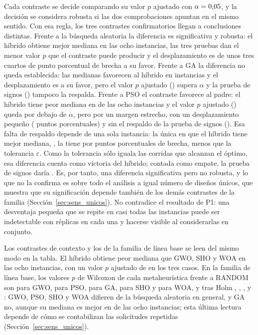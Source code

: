 Cada contraste se decide comparando su valor $p$ ajustado con $\alpha=\text{0,05}$, y la decisión se considera robusta si las dos comprobaciones apuntan en el mismo sentido. Con esa regla, los tres contrastes confirmatorios llegan a conclusiones distintas. Frente a la búsqueda aleatoria la diferencia es significativa y robusta: el híbrido obtiene mejor mediana en las ocho instancias, las tres pruebas dan el menor valor $p$ que el contraste puede producir y el desplazamiento es de unos tres cuartos de punto porcentual de brecha a su favor. Frente a GA la diferencia no queda establecida: las medianas favorecen al híbrido en \CtrlGaMedianWins{} instancias y el desplazamiento es a su favor, pero el valor $p$ ajustado (\CtrlGaWilcoxonHolm) supera $\alpha$ y la prueba de signos (\CtrlGaSignP) tampoco la respalda. Frente a PSO el contraste favorece al padre: el híbrido tiene peor mediana en \CtrlPsoMedianLosses{} de las ocho instancias y el valor $p$ ajustado (\CtrlPsoWilcoxonHolm) queda por debajo de $\alpha$, pero por un margen estrecho, con un desplazamiento pequeño (\CtrlPsoShift{} puntos porcentuales) y sin el respaldo de la prueba de signos (\CtrlPsoSignP). Esa falta de respaldo depende de una sola instancia: la única en que el híbrido tiene mejor mediana, \CtrlPsoSubTolInstances, la tiene por \CtrlPsoSubTolDiff{} puntos porcentuales de brecha, menos que la tolerancia $\varepsilon$. Como la tolerancia sólo iguala las corridas que alcanzan el óptimo, esa diferencia cuenta como victoria del híbrido; contada como empate, la prueba de signos daría \CtrlPsoSignTiesP. Es, por tanto, una diferencia significativa pero no robusta, y lo que no la confirma es sobre todo el análisis a igual número de diseños únicos, que muestra que su significación depende también de los demás contrastes de la familia (Sección~\ref{sec:sens_unicos}). No contradice el resultado de P1: una desventaja pequeña que se repite en casi todas las instancias puede ser indetectable con \Replicates{} réplicas en cada una y hacerse visible al considerarlas en conjunto.

Los contrastes de contexto y los de la familia de línea base se leen del mismo modo en la tabla. El híbrido obtiene peor mediana que GWO, SHO y WOA en las ocho instancias, con un valor $p$ ajustado de \CtrlGwoWilcoxonHolm{} en los tres casos. En la familia de línea base, los valores $p$ de Wilcoxon de cada metaheurística frente a RANDOM son \BaseGwoWilcoxonP{} para GWO, \BasePsoWilcoxonP{} para PSO, \BaseGaWilcoxonP{} para GA, \BaseShoWilcoxonP{} para SHO y \BaseWoaWilcoxonP{} para WOA, y tras Holm \BaseGwoWilcoxonHolm, \BasePsoWilcoxonHolm, \BaseGaWilcoxonHolm, \BaseShoWilcoxonHolm{} y \BaseWoaWilcoxonHolm: GWO, PSO, SHO y WOA difieren de la búsqueda aleatoria en general, y GA no, aunque su mediana es mejor en \BaseGaMedianWins{} de las ocho instancias; esta última lectura depende de cómo se contabilizan las solicitudes repetidas (Sección~\ref{sec:sens_unicos}).

